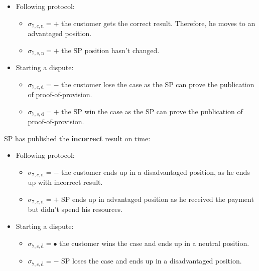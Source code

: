 \documentclass{ieeeaccess}
\begin{document}
\begin{itemize}
\item
  Following protocol:

  \begin{itemize}
  
  \item
    \(\sigma_{7, c, \mathrm{n}} = +\) the customer gets the correct
    result. Therefore, he moves to an advantaged position.
  \item
    \(\sigma_{7, s, \mathrm{n}} = +\) the SP position hasn't changed.
  \end{itemize}
\item
  Starting a dispute:

  \begin{itemize}
  
  \item
    \(\sigma_{7, c, \mathrm{d}} = -\) the customer lose the case as the
    SP can prove the publication of proof-of-provision.
  \item
    \(\sigma_{7, s, \mathrm{d}} = +\) the SP win the case as the SP can
    prove the publication of proof-of-provision.
  \end{itemize}
\end{itemize}

SP has published the \textbf{incorrect} result on time:

\begin{itemize}
\item
  Following protocol:

  \begin{itemize}
  
  \item
    \(\sigma_{7, c, \overline{\mathrm{n}}} = -\) the customer ends up in a disadvantaged position, as he ends up with incorrect result.
  \item
    \(\sigma_{7, c, \overline{\mathrm{n}}} = +\) SP ends up in advantaged
    position as he received the payment but didn't spend his resources.
  \end{itemize}
\item
  Starting a dispute:

  \begin{itemize}
  
  \item
    \(\sigma_{7, c, \overline{\mathrm{d}}} = •\) the customer wins the case and ends up in a neutral position.
  \item
    \(\sigma_{7, c, \overline{\mathrm{d}}} = -\) SP loses the case and ends up in a disadvantaged position.
  \end{itemize}
\end{itemize}
\end{document}
